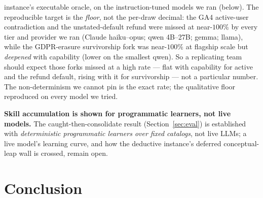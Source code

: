 \documentclass[11pt]{article}
\begin{document}
instance's executable oracle, on the instruction-tuned models we ran (below). The reproducible target is the
\emph{floor}, not the per-draw decimal: the GA4 active-user contradiction and the unstated-default refund
were missed at near-$100\%$ by every tier and provider we ran (Claude haiku--opus; qwen 4B--27B; gemma;
llama), while the GDPR-erasure survivorship fork was near-$100\%$ at flagship scale but \emph{deepened}
with capability (lower on the smallest qwen). So a replicating team should expect those forks missed at a
high rate --- flat with capability for active and the refund default, rising with it for survivorship ---
not a particular number. The non-determinism we cannot pin is the exact rate; the qualitative floor
reproduced on every model we tried.

\textbf{Skill accumulation is shown for programmatic learners, not live models.} The
caught-then-consolidate result (Section~\ref{sec:eval}) is established with \emph{deterministic
programmatic learners over fixed catalogs}, not live LLMs; a live model's learning curve, and how
the deductive instance's deferred conceptual-leap wall is crossed, remain open.

\section{Conclusion}
\label{sec:conclusion}
\end{document}
